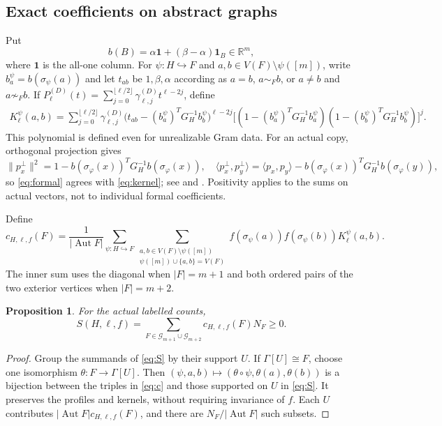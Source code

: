 \documentclass[11pt]{article}
\newtheorem{proposition}[theorem]{Proposition}
\theoremstyle{remark}
\newcommand{\R}{\mathbb R}
\DeclareMathOperator{\Aut}{Aut}
\numberwithin{equation}{section}
\begin{document}
\subsection{Exact coefficients on abstract graphs}\label{subsec:coefficients}
Put
\[
 b(B)=\alpha\mathbf1+(\beta-\alpha)\mathbf1_B\in\R^m,
\]
where $\mathbf1$ is the all-one column.
For $\psi:H\hookrightarrow F$ and $a,b\in V(F)\setminus\psi([m])$,
write $b_a^\psi=b(\sigma_\psi(a))$ and let $t_{ab}$ be $1,\beta,\alpha$
according as $a=b$, $a\sim_F b$, or $a\ne b$ and $a\not\sim_F b$.
If
$P_\ell^{(D)}(t)=\sum_{j=0}^{\lfloor\ell/2\rfloor}
\gamma_{\ell,j}^{(D)}t^{\ell-2j}$, define
\begin{align}
 K_\ell^\psi(a,b)=\sum_{j=0}^{\lfloor\ell/2\rfloor}
 \gamma_{\ell,j}^{(D)}
 \bigl(t_{ab}-(b_a^\psi)^TG_H^{-1}b_b^\psi\bigr)^{\ell-2j}
 \bigl[(1-(b_a^\psi)^TG_H^{-1}b_a^\psi)
 (1-(b_b^\psi)^TG_H^{-1}b_b^\psi)\bigr]^j.
 \label{eq:formal}
\end{align}
This polynomial is defined even for unrealizable Gram data. For an actual
copy, orthogonal projection gives
\[
 \|p_x^\perp\|^2=1-b(\sigma_\varphi(x))^TG_H^{-1}b(\sigma_\varphi(x)),
 \quad
 \langle p_x^\perp,p_y^\perp\rangle
 =\langle p_x,p_y\rangle-b(\sigma_\varphi(x))^TG_H^{-1}b(\sigma_\varphi(y)),
\]
so \eqref{eq:formal} agrees with \eqref{eq:kernel}; see
\cite[Corollary~3.2]{musin} and \cite[Definition~2.11]{kaoyu}.
Positivity applies to the sums on actual
vectors, not to individual formal coefficients.

Define
\begin{equation}\label{eq:c}
 c_{H,\ell,f}(F)=\frac{1}{|\Aut F|}
 \sum_{\psi:H\hookrightarrow F}
 \sum_{\substack{a,b\in V(F)\setminus\psi([m])\\
 \psi([m])\cup\{a,b\}=V(F)}}
 f(\sigma_\psi(a))f(\sigma_\psi(b))K_\ell^\psi(a,b).
\end{equation}
The inner sum uses the diagonal when $|F|=m+1$ and both ordered pairs
of the two exterior vertices when $|F|=m+2$.
\begin{proposition}\label{prop:countingkernel}
For the actual labelled counts,
\begin{equation}\label{eq:countingkernel}
 S(H,\ell,f)=\sum_{F\in\mathcal G_{m+1}\cup\mathcal G_{m+2}}
 c_{H,\ell,f}(F)N_F\ge0.
\end{equation}
\end{proposition}
\begin{proof}
Group the summands of \eqref{eq:S} by their support $U$. If
$\Gamma[U]\cong F$, choose one isomorphism $\theta:F\to\Gamma[U]$.
Then $(\psi,a,b)\mapsto(\theta\circ\psi,\theta(a),\theta(b))$
is a bijection between the triples in \eqref{eq:c} and those supported
on $U$ in \eqref{eq:S}. It preserves the profiles and kernels, without
requiring invariance of $f$. Each $U$ contributes
$|\Aut F|c_{H,\ell,f}(F)$, and there are $N_F/|\Aut F|$ such subsets.
\end{proof}
\end{document}
